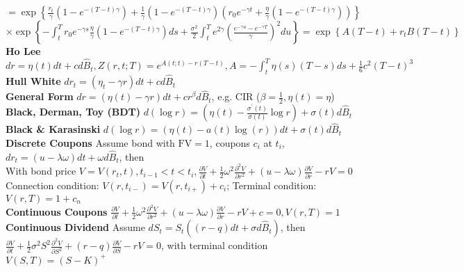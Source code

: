 \documentclass[12pt,landscape, a4paper]{article}
\theoremstyle{remark}
\newcommand{\dd}{\partial}
\begin{document}
\begin{multicols*}{3}
$=\exp \left\{ \frac{r_t}{\gamma} \left(1 - e^{-(T-t)\gamma} \right) + \frac{1}{\gamma} \left(1 - e^{-(T-t)\gamma} \right) \left( r_0 e^{-\gamma t} + \frac{\eta}{\gamma} \left(1 - e^{-(T-t)\gamma} \right) \right) \right\}$\\
$\times \exp \left\{ -\int^T_t r_0 e^{-\gamma s} \frac{\eta}{\gamma} \left(1 - e^{-(T-t)\gamma} \right) ds + \frac{\sigma^2}{2} \int^T_t e^{2\gamma } \left( \frac{e^{-\gamma u} - e^{-\gamma T}}{\gamma}  \right)^2  du  \right\} = \exp \left\{ A(T-t) + r_t B (T-t) \right\}$
\\
\textbf{Ho Lee} $dr = \eta (t) dt + c d \hat{B}_t, Z (r, t; T) = e^{A(t;t) - r(T-t)}, A = -\int^T_t \eta (s) (T-s) ds + \frac{1}{6} c^2 (T-t)^3$\\

\textbf{Hull White} $d r_t = (\eta_t - \gamma r) dt + cd \hat{B}_t$\\

\textbf{General Form} $d r = (\eta (t) - \gamma r) dt + cr^\beta d \hat{B}_t$, e.g. CIR ($\beta = \frac{1}{2}, \eta (t) = \eta$)\\

\textbf{Black, Derman, Toy (BDT)} $d (\log r) = \left(\eta (t) - \frac{\sigma^\prime (t)}{\sigma (t)} \log r \right) + \sigma (t) d \hat{B}_t $\\
\textbf{Black \& Karasinski} $d (\log r) =(\eta (t) - a(t) \log (r) ) dt + \sigma (t) d\hat{B}_t $\\

\textbf{Discrete Coupons} Assume bond with $\mathrm{FV}=1$, coupons $c_i$ at $t_i$, $dr_t = (u - \lambda \omega) dt + \omega d \hat{B}_t$, then\\
With bond price $V = V(r_t, t), t_{i-1} <t <t_i, \frac{\dd V}{\dd t} + \frac{1}{2} \omega^2 \frac{\dd^2 V}{\dd r^2} + (u - \lambda \omega) \frac{\dd V}{\dd r } - rV = 0 $\\
Connection condition: $V(r, t_{i-}) = V(r, t_{i+}) + c_i$; Terminal condition: $V(r, T) = 1 + c_n$\\

\textbf{Continuous Coupons} $\frac{\dd V}{\dd t} + \frac{1}{2} \omega^2 \frac{\dd^2 V}{\dd r^2} + (u - \lambda \omega) \frac{\dd V}{\dd r } - rV +c = 0 , V(r, T) = 1$\\
\textbf{Continuous Dividend} Assume $d S_t =S_t ((r-q) dt + \sigma d\hat{B}_t)$, then $\frac{\dd V}{\dd t} + \frac{1}{2} \sigma^2 S^2 \frac{\dd^2 V}{\dd S^2} + (r-q) \frac{\dd V}{\dd S } - rV = 0$, with terminal condition $V(S, T) = (S-K)^+$\\


\end{multicols*}
\end{document}

